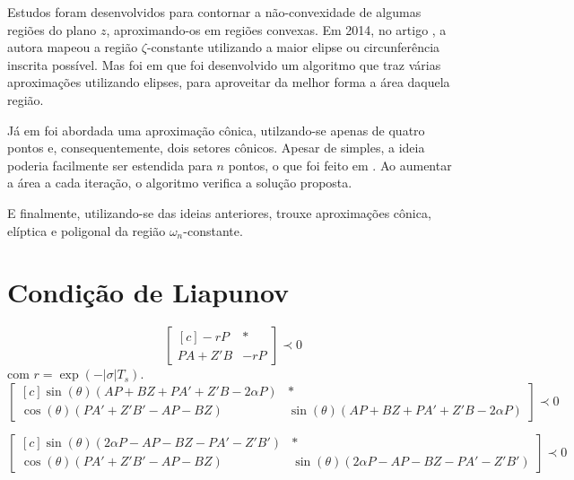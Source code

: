Estudos foram desenvolvidos para contornar a não-convexidade de algumas regiões do plano $z$, aproximando-os em regiões convexas. Em 2014, no artigo \cite{ROSINOVA2014}, a autora mapeou a região $\zeta$-constante utilizando a maior elipse ou circunferência inscrita possível. Mas foi em \cite{ROSINOVA2019} que foi desenvolvido um algoritmo que traz várias aproximações utilizando elipses, para aproveitar da melhor forma a área daquela região.

Já em \cite{WISNIEWSKI2017} foi abordada uma aproximação cônica, utilzando-se apenas de quatro pontos e, consequentemente, dois setores cônicos. Apesar de simples, a ideia poderia facilmente ser estendida para $n$ pontos, o que foi feito em \cite{WISNIEWSKI2019}. Ao aumentar a área a cada iteração, o algoritmo verifica a solução proposta.

E finalmente, utilizando-se das ideias anteriores, \cite{CHIQUETO2021} trouxe aproximações cônica, elíptica e poligonal da região $\omega_n$-constante.

\section{Condição de Liapunov}

\begin{equation}
  \begin{bmatrix*}[c]
    -rP       & * \\
    PA + Z'B  & -rP
  \end{bmatrix*}
  \prec 0\label{eq:LMIEstabilidadeRelativa}
\end{equation}
com $r = \exp{\left(-|\sigma|T_s\right)}$.
\begin{equation}
  \begin{bmatrix*}[c]
    \sin{(\theta)(AP + BZ + PA' + Z'B -2\alpha P)} &  * \\
    \cos{(\theta)(PA' + Z'B'- AP - BZ)}      &  \sin{(\theta)(AP + BZ + PA' + Z'B -2\alpha P)}
  \end{bmatrix*}
  \prec 0\label{eq:LMIESetorConicoEsquerdo}
\end{equation}

\begin{equation}
  \begin{bmatrix*}[c]
    \sin{(\theta)(2\alpha P - AP - BZ - PA' - Z'B')} & * \\
    \cos{(\theta)(PA' + Z'B' - AP - BZ)}       & \sin{(\theta)(2\alpha P - AP - BZ - PA' - Z'B')}
  \end{bmatrix*}
  \prec 0\label{eq:LMIESetorConicoDireito}
\end{equation}

